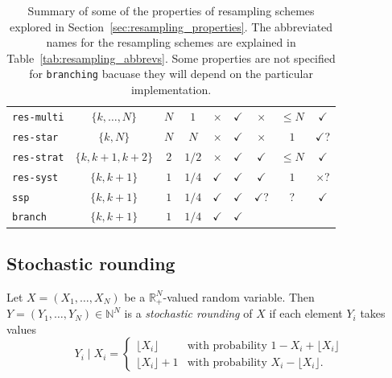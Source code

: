 \begin{landscape}
\begin{table}[ht]
\begin{tabular}{ l | c c c c c c c c }
\texttt{res-multi} & $\{k,\dots,N\}$ & $N$ & $1$ & $\times$ & $\checkmark$ 
        & $\times$ & $\leq N$ & $\checkmark$ \\
\texttt{res-star} & $\{k, N\}$ & $N$ & $N$ & $\times$ & $\checkmark$ 
        & $\times$ & $1$ & $\checkmark$? \\
\texttt{res-strat} & $\{k, k+1, k+2\}$ & $2$ & $1/2$ & $\times$ & $\checkmark$ 
        & $\checkmark$ & $\leq N$ & $\checkmark$ \\
\texttt{res-syst} & $\{k, k+1\}$ & $1$ & $1/4$ & $\checkmark$ & $\checkmark$ 
        & $\checkmark$ & $1$ & $\times$? \\
\texttt{ssp} & $\{k, k+1\}$ & $1$ & $1/4$ & $\checkmark$ & $\checkmark$ 
        & $\checkmark$? & ? & $\checkmark$ \\
\texttt{branch} & $\{k, k+1\}$ & $1$ & $1/4$ & $\checkmark$ & $\checkmark$ 
        & & & \\
\hline\hline
\end{tabular}
\caption[Properties of resampling schemes]{Summary of some of the properties of resampling schemes explored in Section~\ref{sec:resampling_properties}. The abbreviated names for the resampling schemes are explained in Table~\ref{tab:resampling_abbrevs}.  Some properties are not specified for \texttt{branching} bacuase they will depend on the particular implementation.}
\label{tab:resampling_properties}
\end{table} 
\end{landscape}
 
 
 

\subsection{Stochastic rounding \seb{$\checkmark$} }\label{sec:SRs}

\begin{defn}\label{defn:stochround}
 Let $X=(X_1,\dots,X_N)$ be a $\mathbb{R}_+^N$-valued random variable. Then $Y=(Y_1,\dots,Y_N) \in \mathbb{N}^N$ is a \emph{stochastic rounding} of $X$ if each element $Y_i$ takes values
\begin{equation*}
Y_i \mid X_i =
\begin{cases}
 \lfloor X_i \rfloor & \text{with probability } 1- X_i+ \lfloor X_i \rfloor \\
  \lfloor X_i \rfloor +1 & \text{with probability } X_i- \lfloor X_i \rfloor .
\end{cases}
\end{equation*}
\end{defn}


